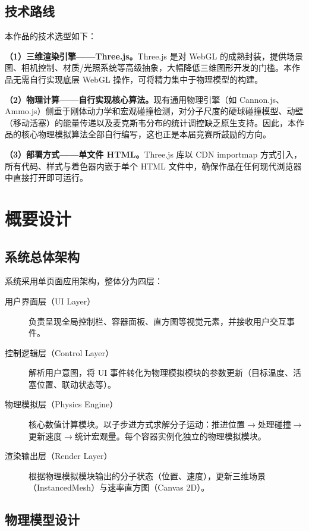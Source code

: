 \documentclass[zihao=-4,a4paper,oneside]{ctexbook}
\newcommand{\chapternb}[1]{%
  \bgroup
  \let\clearpage\relax
  \let\cleardoublepage\relax
  \chapter{#1}%
  \egroup
}
\begin{document}
\section{技术路线}

本作品的技术选型如下：

\textbf{（1）三维渲染引擎——Three.js。}Three.js 是对 WebGL 的成熟封装，提供场景图、相机控制、材质/光照系统等高级抽象，大幅降低三维图形开发的门槛。本作品无需自行实现底层 WebGL 操作，可将精力集中于物理模型的构建。

\textbf{（2）物理计算——自行实现核心算法。}现有通用物理引擎（如 Cannon.js、Ammo.js）侧重于刚体动力学和宏观碰撞检测，对分子尺度的硬球碰撞模型、动壁（移动活塞）的能量传递以及麦克斯韦分布的统计调控缺乏原生支持。因此，本作品的核心物理模拟算法全部自行编写，这也正是本届竞赛所鼓励的方向。

\textbf{（3）部署方式——单文件 HTML。}Three.js 库以 CDN importmap 方式引入，所有代码、样式与着色器内嵌于单个 HTML 文件中，确保作品在任何现代浏览器中直接打开即可运行。

\chapternb{概要设计}

\section{系统总体架构}

系统采用单页面应用架构，整体分为四层：

\begin{description}
  \item[用户界面层（UI Layer）] 负责呈现全局控制栏、容器面板、直方图等视觉元素，并接收用户交互事件。
  \item[控制逻辑层（Control Layer）] 解析用户意图，将 UI 事件转化为物理模拟模块的参数更新（目标温度、活塞位置、联动状态等）。
  \item[物理模拟层（Physics Engine）] 核心数值计算模块。以子步进方式求解分子运动：推进位置$\rightarrow$处理碰撞$\rightarrow$更新速度$\rightarrow$统计宏观量。每个容器实例化独立的物理模拟模块。
  \item[渲染输出层（Render Layer）] 根据物理模拟模块输出的分子状态（位置、速度），更新三维场景（InstancedMesh）与速率直方图（Canvas 2D）。
\end{description}

\section{物理模型设计}
\end{document}
